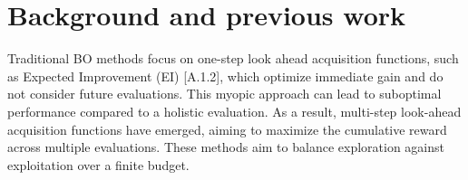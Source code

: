 \documentclass{article}
\newcommand{\bfx}{\textbf{x}}
\begin{document}




\section{Background and previous work}
Traditional BO methods focus on one-step look ahead acquisition 
functions, such as Expected Improvement (EI) [A.1.2], which optimize 
immediate gain and do not consider future evaluations. This myopic 
approach can lead to suboptimal performance compared to a holistic 
evaluation. As a result, multi-step look-ahead acquisition functions have emerged, 
aiming to maximize the cumulative reward across multiple 
evaluations. These methods aim to balance exploration against exploitation over a finite budget. 
\end{document}
